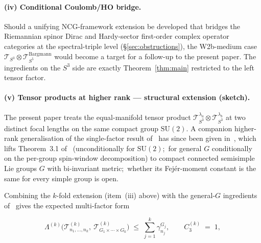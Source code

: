 \documentclass[11pt,a4paper]{article}
\theoremstyle{plain}
\theoremstyle{definition}
\newcommand{\sthree}{S^{3}}
\newcommand{\Tcal}{\mathcal{T}}
\newcommand{\SU}{\mathrm{SU}}
\begin{document}
\paragraph{(iv) Conditional Coulomb/HO bridge.} Should a unifying
NCG-framework extension be developed that bridges the Riemannian
spinor Dirac and Hardy-sector first-order complex operator categories
at the spectral-triple level (\S\ref{sec:obstructions}), the
W2b-medium case
$\Tcal_{\sthree} \otimes \Tcal_{S^5}^{\mathrm{Bargmann}}$ would become
a target for a follow-up to the present paper. The ingredients on the
$\sthree$ side are exactly Theorem~\ref{thm:main} restricted to the
left tensor factor.

\paragraph{(v) Tensor products at higher rank --- structural extension
(sketch).}
The present paper treats the equal-manifold tensor product
$\Tcal_{\sthree}^{\lambda_a} \otimes \Tcal_{\sthree}^{\lambda_b}$ at
two distinct focal lengths on the same compact group $\SU(2)$.
A companion higher-rank generalisation of the single-factor result
of~\cite{loutey_paper38} has since been given
in~\cite{paper40_unified}, which lifts Theorem~3.1
of~\cite{loutey_paper38} (unconditionally for $\SU(2)$;\ for general $G$
conditionally on the per-group spin-window decomposition) to compact
connected semisimple Lie groups $G$
with bi-invariant metric;\ whether its Fej\'er-moment constant is the
same for every simple group is open.

Combining the $k$-fold extension (item~(iii) above) with the
general-$G$ ingredients of~\cite{paper40_unified} gives the expected
multi-factor form

\begin{equation}\label{eq:master_theorem_v}
\Lambda^{(k)}\bigl(\Tcal^{(k)}_{n_{1}, \ldots, n_{k}},\
\Tcal^{(k)}_{G_{1} \times \cdots \times G_{k}}\bigr)
\;\le\; \sum_{j=1}^{k} \gamma^{G_{j}}_{n_{j}},
\qquad
C_{3}^{(k)} \;=\; 1,
\end{equation}
\end{document}

